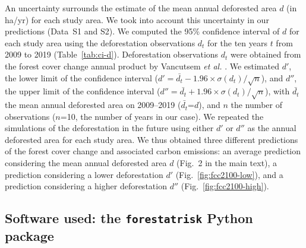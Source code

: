 \documentclass[
  12pt,
]{article}
\begin{document}
An uncertainty surrounds the estimate of the mean annual deforested area \(d\) (in ha/yr) for each study area. We took into account this uncertainty in our predictions (Data~S1 and S2). We computed the 95\% confidence interval of \(d\) for each study area using the deforestation observations \(d_t\) for the ten years \(t\) from 2009 to 2019 (Table~\ref{tab:ci-d}). Deforestation observations \(d_t\) were obtained from the forest cover change annual product by Vancutsem \emph{et al.} \citep{Vancutsem2021}. We estimated \(d'\), the lower limit of the confidence interval (\(d'=\bar{d_t}-1.96 \times \sigma(d_t)/\sqrt n\)), and \(d''\), the upper limit of the confidence interval (\(d''=\bar{d_t}+1.96 \times \sigma(d_t)/\sqrt n\)), with \(\bar{d_t}\) the mean annual deforested area on 2009--2019 (\(\bar{d_t}\)=\(d\)), and \(n\) the number of observations (\(n\)=10, the number of years in our case). We repeated the simulations of the deforestation in the future using either \(d'\) or \(d''\) as the annual deforested area for each study area. We thus obtained three different predictions of the forest cover change and associated carbon emissions: an average prediction considering the mean annual deforested area \(d\) (Fig.~2 in the main text), a prediction considering a lower deforestation \(d'\) (Fig.~\ref{fig:fcc2100-low}), and a prediction considering a higher deforestation \(d''\) (Fig.~\ref{fig:fcc2100-high}).

\hypertarget{software-used-the-forestatrisk-python-package}{%
\subsection{\texorpdfstring{Software used: the \texttt{forestatrisk} Python package}{Software used: the forestatrisk Python package}}\label{software-used-the-forestatrisk-python-package}}
\end{document}
